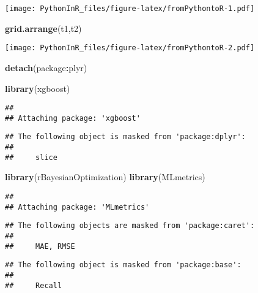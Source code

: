 \documentclass[]{article}
\newenvironment{Shaded}{\begin{snugshade}}{\end{snugshade}}
\newcommand{\KeywordTok}[1]{\textcolor[rgb]{0.13,0.29,0.53}{\textbf{#1}}}
\newcommand{\NormalTok}[1]{#1}
\newcommand{\OperatorTok}[1]{\textcolor[rgb]{0.81,0.36,0.00}{\textbf{#1}}}
\begin{document}
\texttt{[image: PythonInR\_files/figure-latex/fromPythontoR-1.pdf]}

\begin{Shaded}
\begin{Highlighting}[]
\KeywordTok{grid.arrange}\NormalTok{(t1,t2)}
\end{Highlighting}
\end{Shaded}

\texttt{[image: PythonInR\_files/figure-latex/fromPythontoR-2.pdf]}

\begin{Shaded}
\begin{Highlighting}[]
\KeywordTok{detach}\NormalTok{(package}\OperatorTok{:}\NormalTok{plyr)}
\end{Highlighting}
\end{Shaded}

\begin{Shaded}
\begin{Highlighting}[]
\KeywordTok{library}\NormalTok{(xgboost)}
\end{Highlighting}
\end{Shaded}

\begin{verbatim}
## 
## Attaching package: 'xgboost'
\end{verbatim}

\begin{verbatim}
## The following object is masked from 'package:dplyr':
## 
##     slice
\end{verbatim}

\begin{Shaded}
\begin{Highlighting}[]
\KeywordTok{library}\NormalTok{(rBayesianOptimization)}
\KeywordTok{library}\NormalTok{(MLmetrics)}
\end{Highlighting}
\end{Shaded}

\begin{verbatim}
## 
## Attaching package: 'MLmetrics'
\end{verbatim}

\begin{verbatim}
## The following objects are masked from 'package:caret':
## 
##     MAE, RMSE
\end{verbatim}

\begin{verbatim}
## The following object is masked from 'package:base':
## 
##     Recall
\end{verbatim}
\end{document}
